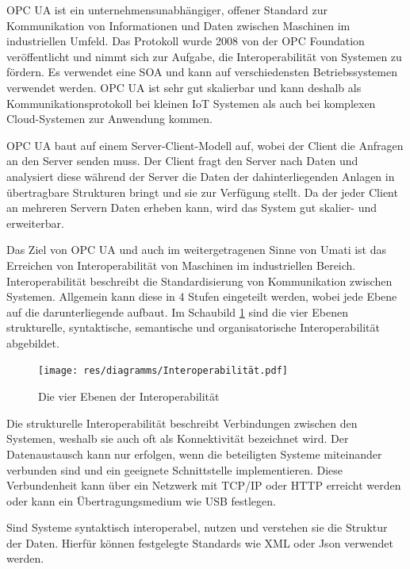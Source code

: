 \documentclass[a4paper, 12pt, oneside, toc=listofnumbered, bibliography=totoc]{scrbook}
\begin{document}
	\ac{OPC UA} ist ein unternehmensunabhängiger, offener Standard zur Kommunikation von Informationen und Daten zwischen Maschinen im industriellen Umfeld. Das Protokoll wurde 2008 von der OPC Foundation veröffentlicht und nimmt sich zur Aufgabe, die Interoperabilität von Systemen zu fördern. Es verwendet eine \ac{SOA} und kann auf verschiedensten Betriebssystemen verwendet werden. OPC UA ist sehr gut skalierbar und kann deshalb als Kommunikationsprotokoll bei kleinen \ac{IoT} Systemen als auch bei komplexen Cloud-Systemen zur Anwendung kommen. 
	 
	OPC UA baut auf einem Server-Client-Modell auf, wobei der Client die Anfragen an den Server senden muss. Der Client fragt den Server nach Daten und analysiert diese während der Server die Daten der dahinterliegenden Anlagen in übertragbare Strukturen bringt und sie zur Verfügung stellt. Da der jeder Client an mehreren Servern Daten erheben kann, wird das System gut skalier- und erweiterbar.
	
	Das Ziel von OPC UA und auch im weitergetragenen Sinne von \ac{Umati} ist das Erreichen von Interoperabilität von Maschinen im industriellen Bereich. Interoperabilität beschreibt die Standardisierung von Kommunikation zwischen Systemen. Allgemein kann diese in 4 Stufen eingeteilt werden, wobei jede Ebene auf die darunterliegende aufbaut. Im Schaubild \ref{fig:Interoperabilität} sind die vier Ebenen strukturelle, syntaktische, semantische und organisatorische Interoperabilität abgebildet.
	 
	 \begin{figure}[H]
	 	\centering
	 	\texttt{[image: res/diagramms/Interoperabilität.pdf]}
	 	\caption{Die vier Ebenen der Interoperabilität}
	 	\label{fig:Interoperabilität}
	 \end{figure}
	 
	 Die strukturelle Interoperabilität beschreibt Verbindungen zwischen den Systemen, weshalb sie auch oft als Konnektivität bezeichnet wird. Der Datenaustausch kann nur erfolgen, wenn die beteiligten Systeme miteinander verbunden sind und ein geeignete Schnittstelle implementieren. Diese Verbundenheit kann über ein Netzwerk mit TCP/IP oder HTTP erreicht werden oder kann ein Übertragungsmedium wie USB festlegen. \cite{mielebacher_verteilte_2021}
	 
	 Sind Systeme syntaktisch interoperabel, nutzen und verstehen sie die Struktur der Daten. Hierfür können festgelegte Standards wie XML oder Json verwendet werden. \cite{mielebacher_verteilte_2021-1}
	 
\end{document}
